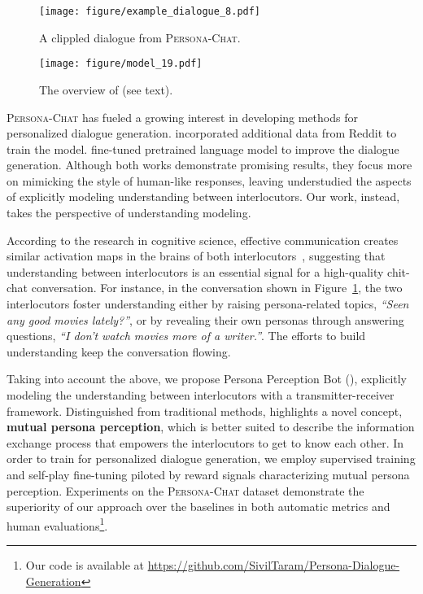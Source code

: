 \documentclass[11pt,a4paper]{article}
\begin{document}
\begin{figure}
    \centering
    \texttt{[image: figure/example\_dialogue\_8.pdf]}
    \caption{A clippled dialogue from \textsc{Persona-Chat}.}
    \label{fig:dialogue_example}
\end{figure}

\begin{figure*}
    \centering
    \texttt{[image: figure/model\_19.pdf]}
    \caption{The overview of  (see text).}
    \label{fig:model_framework}
\end{figure*}


\textsc{Persona-Chat} has fueled a growing interest in developing methods for personalized dialogue generation. \citet{mazare2018training} incorporated additional data from Reddit to train the model. \citet{wolf2019transfertransfo} fine-tuned pretrained language model \cite{Radford2018ImprovingLU} to improve the dialogue generation. Although both works demonstrate promising results, they focus more on mimicking the style of human-like responses, leaving understudied the aspects of explicitly modeling understanding between interlocutors. Our work, instead, takes the perspective of understanding modeling.

According to the research in cognitive science, effective communication creates similar activation maps in the brains of both interlocutors~\cite{hasson2012brain}, suggesting that understanding between interlocutors is an essential signal for a high-quality chit-chat conversation. 
For instance, in the conversation shown in Figure~\ref{fig:dialogue_example}, the two interlocutors foster understanding either by raising persona-related topics, \textit{``Seen any good movies lately?''}, or by revealing their own personas through answering questions, \textit{``I don't watch movies more of a writer.''}. The efforts to build understanding keep the conversation flowing.

Taking into account the above, we propose Persona Perception Bot (), explicitly modeling the understanding between interlocutors with a transmitter-receiver framework. Distinguished from traditional methods,  highlights a novel concept, \textbf{mutual persona perception}, which is better suited to describe the information exchange process that empowers the interlocutors to get to know each other. In order to train  for personalized dialogue generation, we employ supervised training and self-play fine-tuning piloted by reward signals characterizing mutual persona perception. Experiments on the \textsc{Persona-Chat} dataset demonstrate the superiority of our approach over the baselines in both automatic metrics and human evaluations\footnote{Our code is available at \url{https://github.com/SivilTaram/Persona-Dialogue-Generation}}.
\end{document}
